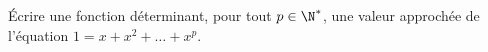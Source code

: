 \question{} Écrire une fonction déterminant, pour tout $p \in \N^\ast$, une valeur approchée de l'équation $1 = x + x^2 + \dots + x^p$. 